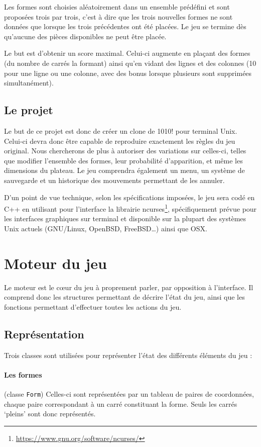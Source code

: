 \documentclass[11pt,a4paper]{article}
\begin{document}
Les formes sont choisies aléatoirement dans un ensemble prédéfini et sont proposées trois par trois, c'est à dire que les trois nouvelles formes ne sont données que lorsque les trois précédentes ont été placées. Le jeu se termine dès qu'aucune des pièces disponibles ne peut être placée.

Le but est d'obtenir un score maximal. Celui-ci augmente en plaçant des formes (du nombre de carrés la formant) ainsi qu'en vidant des lignes et des colonnes (10 pour une ligne ou une colonne, avec des bonus lorsque plusieurs sont supprimées simultanément).

\subsection*{Le projet}
Le but de ce projet est donc de créer un clone de 1010! pour terminal Unix. Celui-ci devra donc être capable de reproduire exactement les règles du jeu original. Nous chercherons de plus à autoriser des variations sur celles-ci, telles que modifier l'ensemble des formes, leur probabilité d'apparition, et même les dimensions du plateau. Le jeu comprendra également un menu, un système de sauvegarde et un historique des mouvements permettant de les annuler.

D'un point de vue technique, selon les spécifications imposées, le jeu sera codé en C++ en utilisant pour l'interface la librairie ncurses\footnote{\url{https://www.gnu.org/software/ncurses/}}, spécifiquement prévue pour les interfaces graphiques sur terminal et disponible sur la plupart des systèmes Unix actuels (GNU/Linux, OpenBSD, FreeBSD\dots) ainsi que OSX.


\clearpage
\section{Moteur du jeu}
Le moteur est le cœur du jeu à proprement parler, par opposition à l'interface. Il comprend donc les structures permettant de décrire l'état du jeu, ainsi que les fonctions permettant d'effectuer toutes les actions du jeu.

\subsection{Représentation}
Trois classes sont utilisées pour représenter l'état des différents éléments du jeu :

\paragraph{Les formes} (classe \verb"Form")
Celles-ci sont représentées par un tableau de paires de coordonnées, chaque paire correspondant à un carré constituant la forme. Seuls les carrés `pleins' sont donc représentés. 
\end{document}
